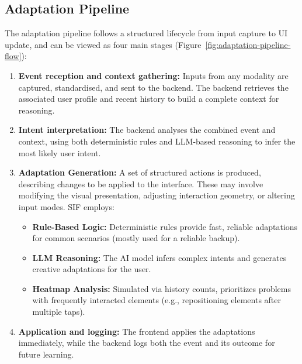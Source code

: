 \subsection{Adaptation Pipeline}
The adaptation pipeline follows a structured lifecycle from input capture to UI update, and can be viewed as four main stages (Figure~\ref{fig:adaptation-pipeline-flow}):
\begin{enumerate}
    \item \textbf{Event reception and context gathering:} Inputs from any modality are captured, standardised, and sent to the backend. The backend retrieves the associated user profile and recent history to build a complete context for reasoning.
    \item \textbf{Intent interpretation:} The backend analyses the combined event and context, using both deterministic rules and LLM-based reasoning to infer the most likely user intent.
    \item \textbf{Adaptation Generation:} A set of structured actions is produced, describing changes to be applied to the interface. These may involve modifying the visual presentation, adjusting interaction geometry, or altering input modes. SIF employs:
        \begin{itemize}
            \item \textbf{Rule-Based Logic:} Deterministic rules provide fast, reliable adaptations for common scenarios (mostly used for a reliable backup).
            \item \textbf{LLM Reasoning:} The AI model infers complex intents and generates creative adaptations for the user.
            \item \textbf{Heatmap Analysis:} Simulated via history counts, prioritizes problems with frequently interacted elements (e.g., repositioning elements after multiple taps).
        \end{itemize}
    \item \textbf{Application and logging:} The frontend applies the adaptations immediately, while the backend logs both the event and its outcome for future learning.
\end{enumerate}

